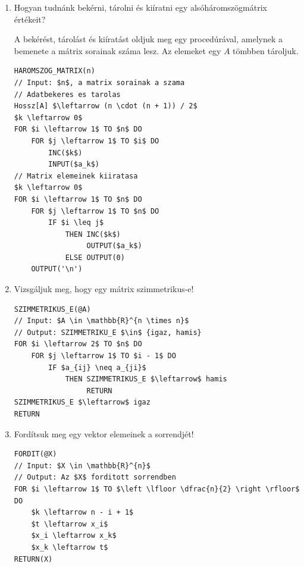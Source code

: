 \documentclass[a4paper]{article}
\newenvironment{solution}
{\color{RoyalBlue}}{\bigskip}
\begin{document}
\begin{enumerate}
\item

Hogyan tudnánk bekérni, tárolni és kiíratni egy alsóháromszögmátrix értékeit?

\begin{solution}
A bekérést, tárolást és kiíratást oldjuk meg egy procedúrával, amelynek a bemenete a mátrix sorainak száma lesz. Az elemeket egy $A$ tömbben tároljuk.
\begin{lstlisting}[mathescape]
HAROMSZOG_MATRIX(n)
// Input: $n$, a matrix sorainak a szama
// Adatbekeres es tarolas
Hossz[A] $\leftarrow (n \cdot (n + 1)) / 2$
$k \leftarrow 0$
FOR $i \leftarrow 1$ TO $n$ DO
    FOR $j \leftarrow 1$ TO $i$ DO
        INC($k$)
        INPUT($a_k$)
// Matrix elemeinek kiiratasa
$k \leftarrow 0$
FOR $i \leftarrow 1$ TO $n$ DO
    FOR $j \leftarrow 1$ TO $n$ DO
        IF $i \leq j$
            THEN INC($k$)
                 OUTPUT($a_k$)
            ELSE OUTPUT(0)
    OUTPUT('\n')
\end{lstlisting}
\end{solution}

\item

Vizsgáljuk meg, hogy egy mátrix szimmetrikus-e!

\begin{solution}
\begin{lstlisting}[mathescape]
SZIMMETRIKUS_E(@A)
// Input: $A \in \mathbb{R}^{n \times n}$
// Output: SZIMMETRIKU_E $\in$ {igaz, hamis}
FOR $i \leftarrow 2$ TO $n$ DO
    FOR $j \leftarrow 1$ TO $i - 1$ DO
        IF $a_{ij} \neq a_{ji}$
            THEN SZIMMETRIKUS_E $\leftarrow$ hamis
                 RETURN
SZIMMETRIKUS_E $\leftarrow$ igaz
RETURN
\end{lstlisting}
\end{solution}

\item

Fordítsuk meg egy vektor elemeinek a sorrendjét!

\begin{solution}
\begin{lstlisting}[mathescape]
FORDIT(@X)
// Input: $X \in \mathbb{R}^{n}$
// Output: Az $X$ forditott sorrendben
FOR $i \leftarrow 1$ TO $\left \lfloor \dfrac{n}{2} \right \rfloor$ DO
    $k \leftarrow n - i + 1$
    $t \leftarrow x_i$
    $x_i \leftarrow x_k$
    $x_k \leftarrow t$
RETURN(X)
\end{lstlisting}
\end{solution}


\end{enumerate}
\end{document}
